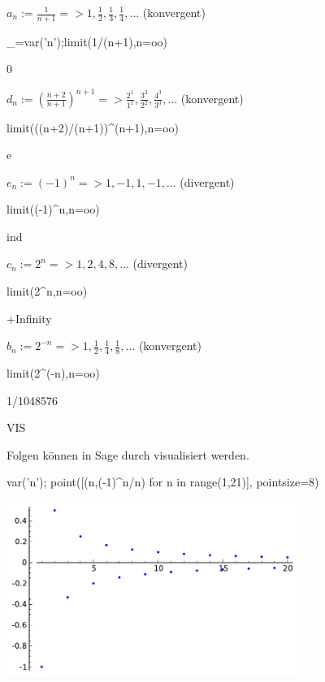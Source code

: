 \documentclass[fontsize=12pt,paper=a4,twoside,bibtotoc,idxtotoc,
liststotoc,pagesize,BCOR1.2cm,DIV15,chapterprefix,pagesize=pdftex]{scrbook}
\theoremstyle{plain}
\theoremstyle{definition}
\theoremstyle{remark}
\begin{document}
  $a_n:= \frac{1}{n+1} => 1, \frac{1}{2}, \frac{1}{3}, \frac{1}{4}, \ldots$  (konvergent)
\begin{sagein}
_=var('n');limit(1/(n+1),n=oo)
\end{sagein}
\begin{sage}
  0
\end{sage}
 $d_n:=\left( \frac{n+2}{n+1} \right)^{n+1} => \frac{2^1}{1^1},\frac{3^2}{2^2}, \frac{4^3}{3^3},...$ (konvergent)
\begin{sagein}
limit(((n+2)/(n+1))^(n+1),n=oo)
\end{sagein}
\begin{sage}
  e
\end{sage}
 $e_n:=(-1)^n => 1,-1,1,-1,...$ (divergent)
\begin{sagein}
limit((-1)^n,n=oo)
\end{sagein}
\begin{sage}
  ind
\end{sage}
 $c_n:=2^n => 1,2,4,8,\ldots$ (divergent)
\begin{sagein}
limit(2^n,n=oo)
\end{sagein}
\begin{sage}
  +Infinity
\end{sage}
  $b_n:= 2^{-n} => 1,\frac{1}{2}, \frac{1}{4}, \frac{1}{8}, \ldots$ (konvergent)
\begin{sagein}
limit(2^(-n),n=oo)
\end{sagein}
\begin{sage}
  1/1048576
\end{sage}


VIS

Folgen können in Sage durch {\color{blue} } visualisiert werden.
\begin{sagein}
var('n');
point([(n,(-1)^n/n) for n in range(1,21)], pointsize=8)
\end{sagein}
\begin{center}
\includegraphics[width=9.5cm]{folge.pdf}
\end{center}
\end{document}

